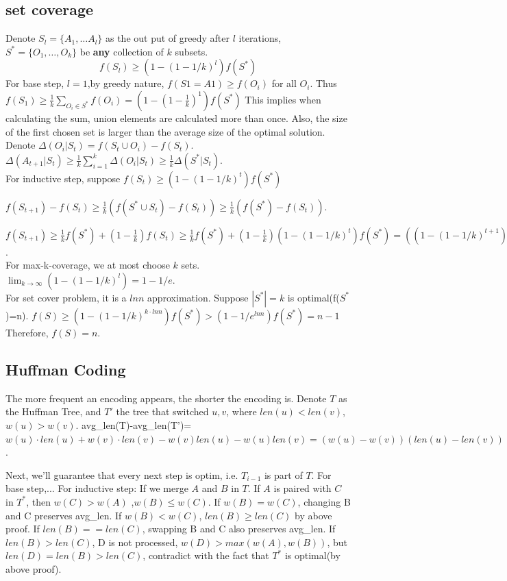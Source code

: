 \documentclass{article}
\begin{document}
\subsection{set coverage}
    Denote $S_l=\{A_1,\ldots A_l\}$ as the out put of greedy after $l$ iterations, $S^*=\{O_1,\ldots, O_k\}$ be \textbf{any} collection of $k$ subsets.
\[f(S_l)\geq (1-(1-1/k)^l)f(S^*)\]
    For base step, $l=1$,by greedy nature, $f(S1={A1})\geq f({O_i})$ for all $O_i$.
    Thus $f(S_1)\geq \frac{1}{k}\sum_{O_i \in S^*}f({O_i})=(1-(1-\frac{1}{k})^1)f(S^*)$ This implies when calculating the sum, union elements are calculated more than once.
    Also, the size of the first chosen set is larger than the average size of the optimal solution.
    Denote $\Delta(O_i|S_t)=f(S_t\cup {O_i})-f(S_t)$.
    $\Delta(A_{t+1}|S_t)\geq\frac{1}{k}\sum_{i=1}^k\Delta(O_i|S_t) \geq \frac{1}{k}\Delta(S^*|S_t)$.\\
    For inductive step, suppose $f(S_t)\geq (1-(1-1/k)^t)f(S^*) $ 

    $f(S_{t+1})-f(S_t)\geq \frac{1}{k}(f(S^*\cup S_t)-f(S_t))\geq \frac{1}{k}(f(S^*)-f(S_t))$.
    
    $f(S_{t+1})\geq \frac{1}{k}f(S^*) + (1-\frac{1}{k})f(S_t)
    \geq \frac{1}{k}f(S^*) + (1-\frac{1}{k})(1-(1-1/k)^t)f(S^*)=((1-(1-1/k)^{t+1})f(S^*))$.\\
For max-k-coverage, we at most choose $k$ sets.
$\lim_{k\rightarrow \infty}(1-(1-1/k)^l) =1-1/e$.\\
For set cover problem, it is a $ln n$ approximation. Suppose $|S^*|=k$ is optimal(f($S^*$)=n).
$f(S)\geq (1-(1-1/k)^{k\cdot ln n})f(S^*)>(1-1/e^{ln n})f(S^*)=n-1$ Therefore, $f(S)=n$.

\subsection{Huffman Coding}
The more frequent an encoding appears, the shorter the encoding is.
    Denote $T$ as the Huffman Tree, and $T'$ the tree that switched $u,v$, where $len(u)<len(v)$, $w(u)>w(v)$.
    avg\_len(T)-avg\_len(T')=$w(u)\cdot len(u)+w(v)\cdot len(v)-w(v)len(u)-w(u)len(v)=(w(u)-w(v))(len(u)-len(v)) <0$.

    Next, we'll guarantee that every next step is optim, i.e. $T_{i-1}$ is part of $T$.
    For base step,...
    For inductive step: If we merge $A$ and $B$ in $T$. If $A$ is paired with $C$ in $T^*$, then $w(C)>w(A)$ ,$w(B)\leq w(C)$. If $w(B)=w(C)$, changing B and C preserves avg\_len.
    If $w(B) < w(C)$, $len(B)\geq len(C)$ by above proof. If $len(B)==len(C)$, swapping B and C also preserves avg\_len. If $len(B)>len(C)$, D is not processed, $w(D)> max(w(A),w(B))$, but $len(D)=len(B)>len(C)$, contradict with the fact that $T^*$ is optimal(by above proof).
\end{document}
